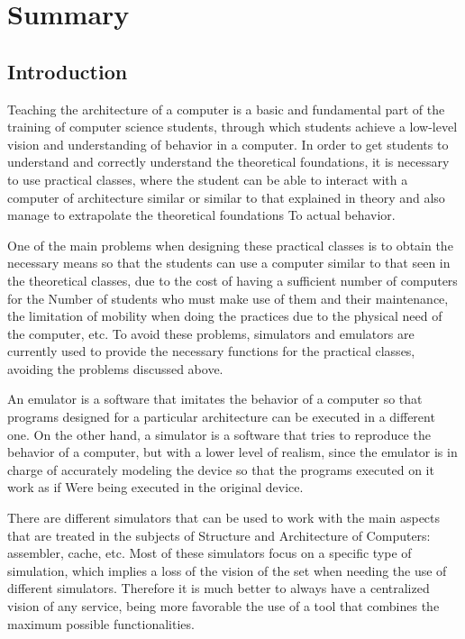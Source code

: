 \chead[]{}
\renewcommand{\headrulewidth}{0.5pt}

\lfoot[]{}
\cfoot[]{}
\rfoot[]{}
\renewcommand{\footrulewidth}{0pt}

\chapter{Summary}

\section{Introduction}

Teaching the architecture of a computer is a basic and fundamental part of the training of computer science students, through which students achieve a low-level vision and understanding of behavior in a computer. In order to get students to understand and correctly understand the theoretical foundations, it is necessary to use practical classes, where the student can be able to interact with a computer of architecture similar or similar to that explained in theory and also manage to extrapolate the theoretical foundations To actual behavior.

One of the main problems when designing these practical classes is to obtain the necessary means so that the students can use a computer similar to that seen in the theoretical classes, due to the cost of having a sufficient number of computers for the Number of students who must make use of them and their maintenance, the limitation of mobility when doing the practices due to the physical need of the computer, etc. To avoid these problems, simulators and emulators are currently used to provide the necessary functions for the practical classes, avoiding the problems discussed above.

An emulator is a software that imitates the behavior of a computer so that programs designed for a particular architecture can be executed in a different one. On the other hand, a simulator is a software that tries to reproduce the behavior of a computer, but with a lower level of realism, since the emulator is in charge of accurately modeling the device so that the programs executed on it work as if Were being executed in the original device.

There are different simulators that can be used to work with the main aspects that are treated in the subjects of Structure and Architecture of Computers: assembler, cache, etc. Most of these simulators focus on a specific type of simulation, which implies a loss of the vision of the set when needing the use of different simulators. Therefore it is much better to always have a centralized vision of any service, being more favorable the use of a tool that combines the maximum possible functionalities.

